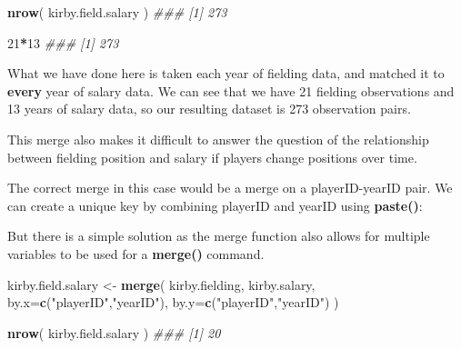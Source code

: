 \documentclass[]{book}
\newenvironment{Shaded}{\begin{snugshade}}{\end{snugshade}}
\newcommand{\CommentTok}[1]{\textcolor[rgb]{0.56,0.35,0.01}{\textit{#1}}}
\newcommand{\DataTypeTok}[1]{\textcolor[rgb]{0.13,0.29,0.53}{#1}}
\newcommand{\DecValTok}[1]{\textcolor[rgb]{0.00,0.00,0.81}{#1}}
\newcommand{\KeywordTok}[1]{\textcolor[rgb]{0.13,0.29,0.53}{\textbf{#1}}}
\newcommand{\NormalTok}[1]{#1}
\newcommand{\OperatorTok}[1]{\textcolor[rgb]{0.81,0.36,0.00}{\textbf{#1}}}
\newcommand{\StringTok}[1]{\textcolor[rgb]{0.31,0.60,0.02}{#1}}
\theoremstyle{definition}
\theoremstyle{definition}
\theoremstyle{definition}
\theoremstyle{remark}
\begin{document}
\begin{Shaded}
\begin{Highlighting}[]
\KeywordTok{nrow}\NormalTok{( kirby.field.salary )}
\CommentTok{### [1] 273}

\DecValTok{21}\OperatorTok{*}\DecValTok{13}
\CommentTok{### [1] 273}
\end{Highlighting}
\end{Shaded}

What we have done here is taken each year of fielding data, and matched
it to \textbf{every} year of salary data. We can see that we have 21
fielding observations and 13 years of salary data, so our resulting
dataset is 273 observation pairs.

This merge also makes it difficult to answer the question of the
relationship between fielding position and salary if players change
positions over time.

The correct merge in this case would be a merge on a playerID-yearID
pair. We can create a unique key by combining playerID and yearID using
\textbf{paste()}:

\begin{Shaded}
\end{Shaded}

But there is a simple solution as the merge function also allows for
multiple variables to be used for a \textbf{merge()} command.

\begin{Shaded}
\begin{Highlighting}[]
\NormalTok{kirby.field.salary <-}\StringTok{ }\KeywordTok{merge}\NormalTok{( kirby.fielding, kirby.salary, }
                            \DataTypeTok{by.x=}\KeywordTok{c}\NormalTok{(}\StringTok{"playerID"}\NormalTok{,}\StringTok{"yearID"}\NormalTok{), }
                            \DataTypeTok{by.y=}\KeywordTok{c}\NormalTok{(}\StringTok{"playerID"}\NormalTok{,}\StringTok{"yearID"}\NormalTok{)   )}

\KeywordTok{nrow}\NormalTok{( kirby.field.salary )}
\CommentTok{### [1] 20}
\end{Highlighting}
\end{Shaded}
\end{document}
